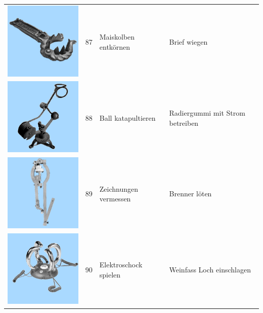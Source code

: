 \documentclass[
  english,
  doc,12pt,twoside,floatsintext]{apa7}
\begin{document}
\begin{center}
\begin{ThreePartTable}
\begin{longtable}{llll}
\includegraphics[valign=c, scale=0.19]{../materials/unfamiliar/87.png} & 87 & Maiskolben entkörnen & Brief wiegen\\
\includegraphics[valign=c, scale=0.19]{../materials/unfamiliar/88.png} & 88 & Ball katapultieren & Radiergummi mit Strom betreiben\\
\includegraphics[valign=c, scale=0.19]{../materials/unfamiliar/89.png} & 89 & Zeichnungen vermessen & Brenner löten\\
\includegraphics[valign=c, scale=0.19]{../materials/unfamiliar/90.png} & 90 & Elektroschock spielen & Weinfass Loch einschlagen\\

\end{longtable}
\end{ThreePartTable}
\end{center}
\end{document}

